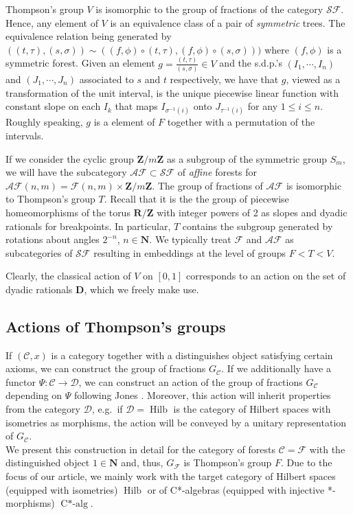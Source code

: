 \documentclass[a4paper,12pt]{amsart}
\numberwithin{equation}{section}
\theoremstyle{definition}
\DeclareMathOperator{\Calg}{C*-alg}
\newcommand{\cC}{\mathcal C}
\newcommand{\D}{\mathbf D}
\newcommand{\cD}{\mathcal D}
\newcommand{\cF}{\mathcal F}
\newcommand{\cAF}{\mathcal{AF}}
\DeclareMathOperator{\Hilb}{Hilb}
\newcommand{\N}{\mathbf{N}}
\newcommand{\R}{\mathbf{R}}
\newcommand{\cSF}{\mathcal{SF}}
\newcommand{\Z}{\mathbf{Z}}
\begin{document}
Thompson's group $V$ is isomorphic to the group of fractions of the category $\cSF$.
Hence, any element of $V$ is an equivalence class of a pair of \emph{symmetric} trees.
The equivalence relation being generated by $( (t,\tau) , (s,\sigma) ) \sim ((f,\phi)\circ (t,\tau) , (f,\phi)\circ (s,\sigma) ) )$ where $(f,\phi)$ is a symmetric forest.
Given an element $g=\tfrac{(t,\tau)}{(s,\sigma)} \in V$ and the s.d.p.'s $(I_1,\cdots,I_n)$ and $(J_1,\cdots,J_n)$ associated to $s$ and $t$ respectively, we have that $g$, viewed as a transformation of the unit interval, is the unique piecewise linear function with constant slope on each $I_k$ that maps $I_{\sigma^{-1}(i)}$ onto $J_{\tau^{-1}(i)}$ for any $1\leq i\leq n.$
Roughly speaking, $g$ is a  element of $F$ together with a permutation of the intervals.

If we consider the cyclic group $\Z/m\Z$ as a subgroup of the symmetric group $S_m$, we will have the subcategory $\cAF\subset \cSF$ of \emph{affine} forests for $\cAF(n,m)=\cF(n,m)\times \Z/m\Z$.
The group of fractions of $\cAF$ is isomorphic to Thompson's group $T$.
Recall that it is the the group of piecewise  homeomorphisms of the torus $\R/\Z$ with integer powers of 2 as slopes and dyadic rationals for breakpoints.
In particular, $T$ contains the subgroup generated by rotations about angles $2^{-n}$, $n\in\N$.
We typically treat $\cF$ and $\cAF$ as subcategories of $\cSF$ resulting in embeddings at the level of groups $F<T<V$.

Clearly, the classical action of $V$ on $[0,1]$ corresponds to an action on the set of dyadic rationals $\D$, which we freely make use.

\subsection{Actions of Thompson's groups}\label{sec:Actions}
If $(\cC,x)$ is a category together with a distinguishes object satisfying certain axioms, we can construct the group of fractions $G_\cC$.
If we additionally have a functor $\Psi:\cC\to \cD$, we can construct an action of the group of fractions $G_\cC$ depending on $\Psi$ following Jones \cite{Jones16-Thompson}.
Moreover, this action will inherit properties from the category $\cD$, e.g.~if $\cD=\Hilb$ is the category of Hilbert spaces with isometries as morphisms, the action will be conveyed by a unitary representation of $G_\cC$.\\[0.25cm]
We present this construction in detail for the category of forests $\cC=\cF$ with the distinguished object $1\in\N$ and, thus, $G_\cF$ is Thompson's group $F$.
Due to the focus of our article, we mainly work with the target category of Hilbert spaces (equipped with isometries) $\Hilb$ or of C*-algebras (equipped with injective *-morphisms) $\Calg$.
\end{document}

